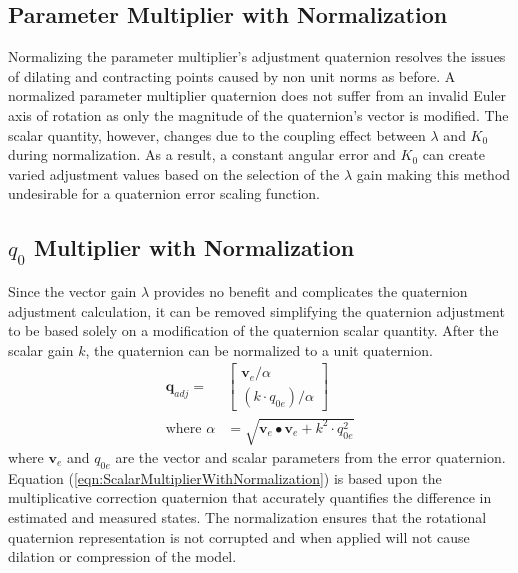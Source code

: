 \documentclass[]{aiaa-tc}%
\newcommand{\bs}[1]{\boldsymbol{#1}}
\begin{document}
\subsection{Parameter Multiplier with Normalization}
\label{subsec:ParameterMultiplierwithNormalization}

Normalizing the parameter multiplier's adjustment quaternion resolves the issues of dilating and contracting points caused by non unit norms as before.  A normalized parameter multiplier quaternion does not suffer from an invalid Euler axis of rotation as only the magnitude of the quaternion's vector is modified.  The scalar quantity, however, changes due to the coupling effect between $\lambda$ and $K_{0}$ during normalization.  As a result, a constant angular error and $K_{0}$ can create varied adjustment values based on the selection of the $\lambda$ gain making this method undesirable for a quaternion error scaling function.

\subsection{$q_0$ Multiplier with Normalization}
\label{subsec:q0MultiplierWithNormalization}

Since the vector gain $\lambda$ provides no benefit and complicates the quaternion adjustment calculation, it can be removed simplifying the quaternion adjustment to be based solely on a modification of the quaternion scalar quantity.  After the scalar gain $k$, the quaternion can be normalized to a unit quaternion.
\begin{equation}
  \begin{aligned}
  \bs{q}_{adj} = & \begin{bmatrix} \bs{v}_e / \alpha \\ ( k \cdot q_{0e} )  / \alpha \end{bmatrix} \\
  \text{where } \alpha & = \sqrt{\bs{v}_e \bullet \bs{v}_e + k^2 \cdot q_{0e}^2}
  \end{aligned}
  \label{eqn:ScalarMultiplierWithNormalization}
\end{equation}
where $\bs{v}_e$ and $q_{0e}$ are the vector and scalar parameters from the error quaternion.  Equation (\ref{eqn:ScalarMultiplierWithNormalization}) is based upon the multiplicative correction quaternion that accurately quantifies the difference in estimated and measured states.  The normalization ensures that the rotational quaternion representation is not corrupted and when applied will not cause dilation or compression of the model.
\end{document}
